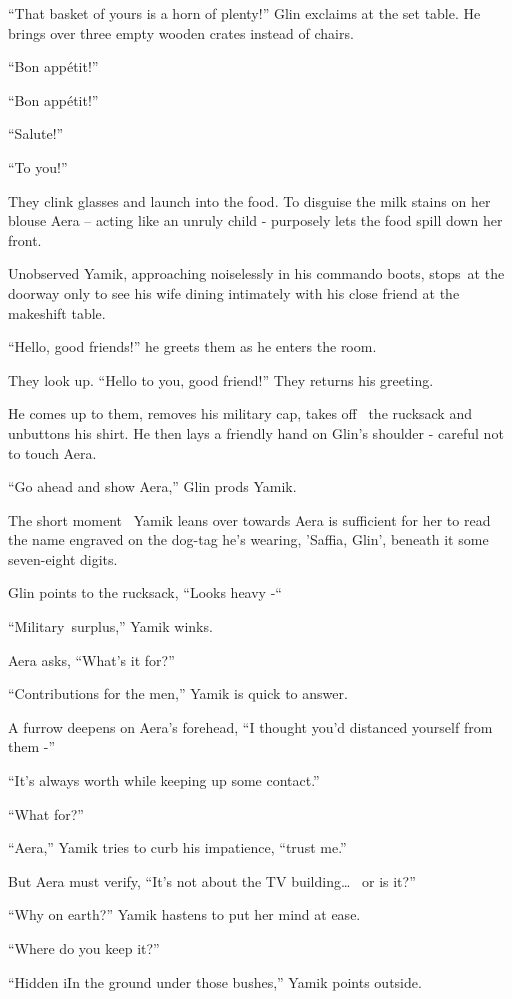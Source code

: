 \documentclass[twoside,11pt]{book}
\begin{document}
``That basket of yours is a horn of plenty!'' Glin exclaims at the set table. He brings over
three empty wooden crates instead of chairs.

``Bon app\'etit!''

``Bon app\'etit!''

``Salute!''

``To you!''

They clink glasses and launch into the food. To disguise the milk stains on her blouse Aera -- acting like an unruly
child - purposely lets the food spill down her front.

Unobserved Yamik, approaching noiselessly in his commando boots, stops~at the doorway only to see his wife dining
intimately with his close friend at the makeshift table.

``Hello, good friends!'' he greets them as he enters the room. ~

They look up. ``Hello to you,{ }good{ }friend!'' They returns
his greeting.

He comes up to them, removes{ }his military cap, takes off \ the rucksack and
unbuttons his shirt. He then lays a friendly hand on Glin's shoulder - careful not to touch Aera.

``Go ahead and show Aera,'' Glin prods Yamik.

The short moment \ Yamik leans over towards Aera is sufficient for her to read the name engraved on the
dog{{}-}tag he's wearing, 'Saffia, Glin', beneath it some seven-eight digits.

Glin points to the rucksack, ``Looks heavy -``~

``Military~surplus,'' Yamik winks.

Aera asks, ``What's it for?''

``Contributions for the men,'' Yamik is quick to answer.

A furrow deepens on Aera's forehead, ``I thought you'd distanced yourself from them -''

``It's always worth while keeping up some contact.''

``What for?''

``Aera,'' Yamik tries to curb his impatience, ``trust me.''

But Aera must verify, ``It's not about the TV building{\dots} \ or is it?''

``Why on earth?'' Yamik hastens to put her mind at ease. ~

``Where do you keep it?''

``Hidden iIn the ground under those bushes,'' Yamik points outside.
\end{document}
